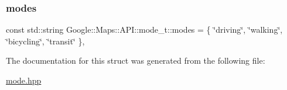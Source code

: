 \mbox{\label{a00051_a752861e4de1fd7afb443595988a86a01}} 
\subsubsection{\texorpdfstring{modes}{modes}}
{\footnotesize\ttfamily const std\+::string Google\+::\+Maps\+::\+A\+P\+I\+::mode\+\_\+t\+::modes = \{ \char`\"{}driving\char`\"{}, \char`\"{}walking\char`\"{}, \char`\"{}bicycling\char`\"{}, \char`\"{}transit\char`\"{} \}\hspace{0.3cm}{\ttfamily [static]}, {\ttfamily [private]}}



The documentation for this struct was generated from the following file\+:\begin{DoxyCompactItemize}
\item 
\hyperlink{a00023}{mode.\+hpp}\end{DoxyCompactItemize}
